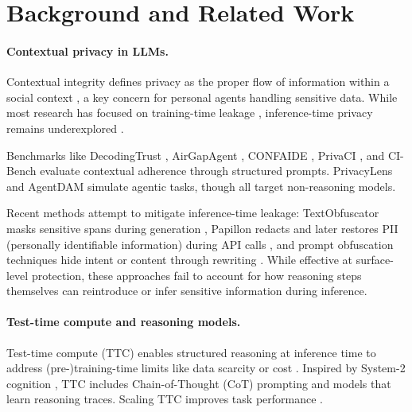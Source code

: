 \section{Background and Related Work}


\paragraph{Contextual privacy in LLMs.} 

Contextual integrity defines privacy as the proper flow of information within a social context \citep{nissenbaum_privacy_2004,shvartzshnaider2025position}, a key concern for personal agents handling sensitive data. While most research has focused on training-time leakage \citep{siwon2023neurips,brown-2024-improved,puerto-etal-2025-scaling}, inference-time privacy remains underexplored \citep{evertz2024whispers,yan2025protecting}.

Benchmarks like DecodingTrust \citep{wang2023decodingtrust}, AirGapAgent \citep{bagdasarian2024airgapagent}, CONFAIDE \citep{mireshghallah2024can}, PrivaCI \citep{li2025privaci}, and CI-Bench \citep{cheng2024ci} evaluate contextual adherence through structured prompts. PrivacyLens \citep{privacylens} and AgentDAM \citep{agentdam} simulate agentic tasks, though all target non-reasoning models.

Recent methods attempt to mitigate inference-time leakage: TextObfuscator masks sensitive spans during generation \citep{zhou2023textobfuscator}, Papillon redacts and later restores PII (personally identifiable information) during API calls \citep{siyan2024papillon}, and prompt obfuscation techniques hide intent or content through rewriting \citep{pape2024prompt}. While effective at surface-level protection, these approaches fail to account for how reasoning steps themselves can reintroduce or infer sensitive information during inference.


\paragraph{Test-time compute and reasoning models.} 

Test-time compute (TTC) enables structured reasoning at inference time to address (pre-)training-time limits like data scarcity or cost \citep{ji2025test,villalobos2022will}. Inspired by System-2 cognition \citep{weston2023system}, TTC includes Chain-of-Thought (CoT) prompting and models that learn reasoning traces. Scaling TTC improves task performance \citep{snell2024scaling}.

